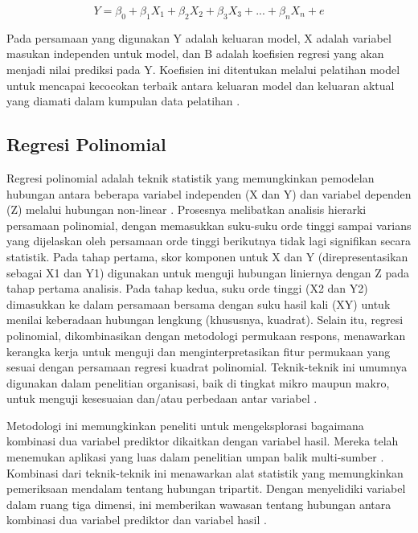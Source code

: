 \begin{equation}
  \label{eq:RumusRegresiLinearBerganda}
  Y = \beta_0 + \beta_1 X_1 + \beta_2 X_2 + \beta_3 X_3 + ... + \beta_n X_n + e
\end{equation}

Pada persamaan yang digunakan Y adalah keluaran model, X adalah variabel masukan independen untuk model, dan B adalah koefisien regresi yang akan menjadi nilai prediksi pada Y. Koefisien ini ditentukan melalui pelatihan model untuk mencapai kecocokan terbaik antara keluaran model dan keluaran aktual yang diamati dalam kumpulan data pelatihan \parencite{Grant}.

\subsection{Regresi Polinomial}
\label{subsec:regresipolinomial}

Regresi polinomial adalah teknik statistik yang memungkinkan pemodelan hubungan antara beberapa variabel independen (X dan Y) dan variabel dependen (Z) melalui hubungan non-linear \parencite{Shanock}. Prosesnya melibatkan analisis hierarki persamaan polinomial, dengan memasukkan suku-suku orde tinggi sampai varians yang dijelaskan oleh persamaan orde tinggi berikutnya tidak lagi signifikan secara statistik. Pada tahap pertama, skor komponen untuk X dan Y (direpresentasikan sebagai X1 dan Y1) digunakan untuk menguji hubungan liniernya dengan Z pada tahap pertama analisis. Pada tahap kedua, suku orde tinggi (X2 dan Y2) dimasukkan ke dalam persamaan bersama dengan suku hasil kali (XY) untuk menilai keberadaan hubungan lengkung (khususnya, kuadrat). Selain itu, regresi polinomial, dikombinasikan dengan metodologi permukaan respons, menawarkan kerangka kerja untuk menguji dan menginterpretasikan fitur permukaan yang sesuai dengan persamaan regresi kuadrat polinomial. Teknik-teknik ini umumnya digunakan dalam penelitian organisasi, baik di tingkat mikro maupun makro, untuk menguji kesesuaian dan/atau perbedaan antar variabel \parencite{Shanock}.

Metodologi ini memungkinkan peneliti untuk mengeksplorasi bagaimana kombinasi dua variabel prediktor dikaitkan dengan variabel hasil. Mereka telah menemukan aplikasi yang luas dalam penelitian umpan balik multi-sumber \parencite{Shanock}. Kombinasi dari teknik-teknik ini menawarkan alat statistik yang memungkinkan pemeriksaan mendalam tentang hubungan tripartit. Dengan menyelidiki variabel dalam ruang tiga dimensi, ini memberikan wawasan tentang hubungan antara kombinasi dua variabel prediktor dan variabel hasil \parencite{Shanock}.

